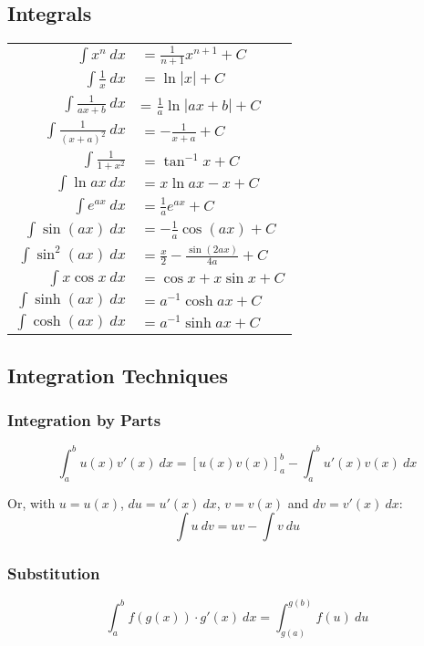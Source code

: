 \subsection{Integrals}
\begin{tabular}[h]{rl}
	$\int x^n\ dx$ & $= \frac{1}{n+1}x^{n+1} + C$ \\
	$\int \frac{1}{x}\ dx$ & $= \ln |x| + C$ \\
	$\int \frac{1}{ax + b}\ dx$ & = $\frac{1}{a} \ln |ax+b| + C$ \\
	$\int \frac{1}{(x+a)^2}\ dx$ & $= -\frac{1}{x+a} + C$ \\
	$\int \frac{1}{1 + x^2}$ & $= \tan^{-1} x + C$ \\
	$\int \ln ax\ dx$ & $= x\ln ax - x + C$ \\
	$\int e^{ax}\ dx$ & $= \frac{1}{a} e^{ax} + C$ \\
	$\int \sin(ax)\ dx$ & $= -\frac{1}{a}\cos(ax) + C$ \\
	$\int \sin^2(ax)\ dx$ & $= \frac{x}{2}-\frac{\sin(2ax)}{4a} + C$ \\
	$\int x\cos x\ dx$ & $= \cos x + x\sin x + C$ \\
	$\int \sinh(ax)\ dx$ & $= a^{-1}\cosh{ax} + C$ \\
	$\int \cosh(ax)\ dx$ & $= a^{-1}\sinh{ax} + C$ \\
\end{tabular}

\subsection{Integration Techniques}
\subsubsection{Integration by Parts}
\begin{equation*}
	\int_a^b u(x)v'(x)\ dx = \left[ u(x)v(x) \right]_a^b-\int_a^bu'(x)v(x)\ dx
\end{equation*}

Or, with $u=u(x)$, $du=u'(x)\ dx$, $v=v(x)$ and $dv=v'(x)\ dx$:
\begin{equation*}
	\int u\ dv=uv - \int v\ du
\end{equation*}

\subsubsection{Substitution}
\begin{equation*}
	\int_a^b f(g(x))\cdot g'(x)\ dx = \int_{g(a)}^{g(b)}f(u)\ du
\end{equation*}

